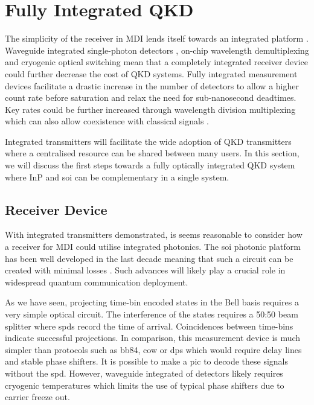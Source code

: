 \section{Fully Integrated QKD}

The simplicity of the receiver in \ac{MDI} lends itself towards an integrated platform \cite{wang2019}. Waveguide integrated single-photon detectors \cite{sprengers2011}, on-chip wavelength demultiplexing \cite{sugita2000} and cryogenic optical switching \cite{eltes2019} mean that a completely integrated receiver device could further decrease the cost of \ac{QKD} systems. Fully integrated measurement devices facilitate a drastic increase in the number of detectors to allow a higher count rate before saturation and relax the need for sub-nanosecond deadtimes. Key rates could be further increased through wavelength division multiplexing which can also allow coexistence with classical signals \cite{price2018}. 


Integrated transmitters will facilitate the wide adoption of \ac{QKD} transmitters where a centralised resource can be shared between many users. In this section, we will discuss the first steps towards a fully optically integrated \ac{QKD} system where \ac{InP} and \ac{soi} can be complementary in a single system.

\subsection{Receiver Device}

With integrated transmitters demonstrated, is seems reasonable to consider how a receiver for \ac{MDI} could utilise integrated photonics. The \ac{soi} photonic platform has been well developed in the last decade meaning that such a circuit can be created with minimal losses \cite{wang2019integrated}. Such advances will likely play a crucial role in widespread quantum communication deployment.

As we have seen, projecting time-bin encoded states in the Bell basis requires a very simple optical circuit. The interference of the states requires a 50:50 beam splitter where \acp{spd} record the time of arrival. Coincidences between time-bins indicate successful projections. In comparison, this measurement device is much simpler than protocols such as \ac{bb84}, \ac{cow} or \ac{dps} which would require delay lines and stable phase shifters. It is possible to make a \ac{pic} to decode these signals \cite{Sibson2017InP} without the \ac{spd}. However, waveguide integrated of detectors likely requires cryogenic temperatures which limits the use of typical phase shifters due to carrier freeze out.

